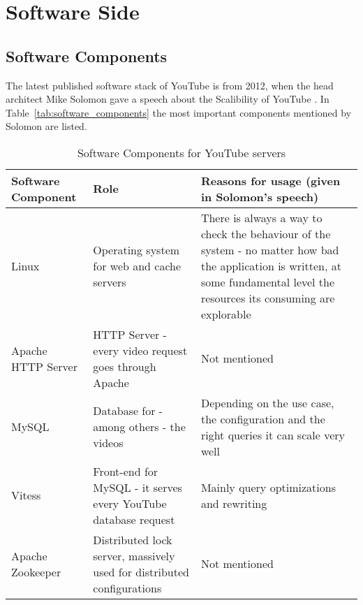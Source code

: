 \section{Software Side}
\subsection{Software Components}

The latest published software stack of YouTube is from 2012, when the head architect Mike Solomon gave a speech about the Scalibility of YouTube \cite{misc:scalibility_at_youtube} \cite{misc:hihgscalibility}. In Table~\vref{tab:software_components} the most important components mentioned by Solomon are listed.

\begin{table}[htbp]
  \begin{center}
    \begin{tabularx}{\textwidth}{|p{}|p{}|X|}
      \hline
      \textbf{Software \newline Component} & \textbf{Role} & \textbf{Reasons for usage} \newline (given in Solomon's speech) \\
      \hline
      \hline
      Linux & Operating system for web and cache servers & There is always a way to check the behaviour of the system - no matter how bad the application is written, at some fundamental level the resources its consuming are explorable \\
      \hline
      Apache \newline HTTP Server & HTTP Server - every video request goes through Apache & Not mentioned \\
      \hline
      MySQL & Database for - among others - the videos & Depending on the use case, the configuration and the right queries it can scale very well \\
      \hline
      Vitess & Front-end for MySQL - it serves every YouTube database request & Mainly query optimizations and rewriting \\
      \hline
      Apache Zookeeper & Distributed lock server, massively used for distributed configurations & Not mentioned \\
      \hline
    \end{tabularx}
    \caption{Software Components for YouTube servers}
    \label{tab:software_components}
  \end{center}
\end{table}

